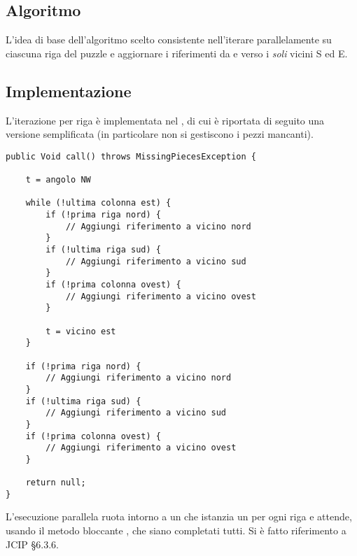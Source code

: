 \documentclass[a4paper]{article}
\begin{document}
\subsection{Algoritmo}
L'idea di base dell'algoritmo scelto consistente nell'iterare parallelamente su ciascuna riga del puzzle e aggiornare i riferimenti da e verso i \emph{soli} vicini S ed E.
\subsection{Implementazione}
L'iterazione per riga \`e implementata nel  , di cui \`e riportata di seguito una versione semplificata (in particolare non si gestiscono i pezzi mancanti).

\begin{verbatim}
public Void call() throws MissingPiecesException {

	t = angolo NW

	while (!ultima colonna est) {
		if (!prima riga nord) {
			// Aggiungi riferimento a vicino nord
		}
		if (!ultima riga sud) {
			// Aggiungi riferimento a vicino sud
		}
		if (!prima colonna ovest) {
			// Aggiungi riferimento a vicino ovest
		}

		t = vicino est
	}

	if (!prima riga nord) {
		// Aggiungi riferimento a vicino nord
	}
	if (!ultima riga sud) {
		// Aggiungi riferimento a vicino sud
	}
	if (!prima colonna ovest) {
		// Aggiungi riferimento a vicino ovest
	}

	return null;
}
\end{verbatim}

L'esecuzione parallela ruota intorno a un  che istanzia un  per ogni riga e attende, usando il metodo bloccante , che siano completati tutti.
Si \`e fatto riferimento a JCIP §6.3.6.
\end{document}

